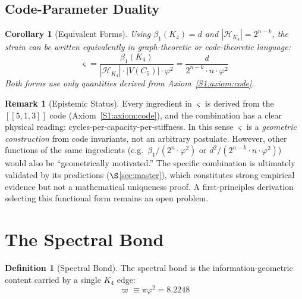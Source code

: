 \documentclass[11pt,a4paper]{article}
\newtheorem{corollary}[theorem]{Corollary}
\theoremstyle{definition}
\newtheorem{definition}[theorem]{Definition}
\newtheorem{remark}[theorem]{Remark}
\newcommand{\gs}{\varsigma}
\newcommand{\specbond}{\varpi}
\begin{document}
\subsection{Code-Parameter Duality}

\begin{corollary}[Equivalent Forms]
\label{S1:cor:strain_forms}
Using $\beta_1(K_4) = d$ and $|\mathcal{H}_{K_4}| = 2^{n-k}$, the strain can be written equivalently in graph-theoretic or code-theoretic language:
\begin{equation}
\gs = \frac{\beta_1(K_4)}{|\mathcal{H}_{K_4}| \cdot |V(C_5)| \cdot \varphi^2} = \frac{d}{2^{n-k} \cdot n \cdot \varphi^2}
\label{S1:eq:strain_dual}
\end{equation}
Both forms use only quantities derived from Axiom~\ref{S1:axiom:code}.
\end{corollary}

\begin{remark}[Epistemic Status]
\label{S1:rem:strain_status}
Every ingredient in $\gs$ is derived from the $[[5,1,3]]$ code (Axiom~\ref{S1:axiom:code}), and the combination has a clear physical reading: cycles-per-capacity-per-stiffness. In this sense $\gs$ is a \emph{geometric construction} from code invariants, not an arbitrary postulate. However, other functions of the same ingredients (e.g.\ $\beta_1/(2^n \cdot \varphi^2)$ or $d^2/(2^{n-k} \cdot n \cdot \varphi^2)$) would also be ``geometrically motivated.'' The specific combination is ultimately validated by its predictions ($\S$\ref{sec:master}), which constitutes strong empirical evidence but not a mathematical uniqueness proof. A first-principles derivation selecting this functional form remains an open problem.
\end{remark}

\section{The Spectral Bond}
\label{sec:specbond}

\begin{definition}[Spectral Bond]
\label{S1:def:specbond}
The spectral bond is the information-geometric content carried by a single $K_4$ edge:
\begin{equation}
\boxed{\specbond \equiv \pi\varphi^2 = 8.2248}
\label{S1:eq:specbond}
\end{equation}
\end{definition}
\end{document}
